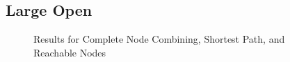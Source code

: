\documentclass[runningheads]{llncs}
\begin{document}
\subsection{Large Open}
\begin{figure}[H]
\begin{minipage}{.4\linewidth} 
\caption{Results for Complete Node Combining, Shortest Path, and Reachable Nodes}
\end{minipage}
\hspace{1.5cm}
\begin{minipage}{.4\linewidth} 

\end{minipage}
\end{figure}
\end{document}
